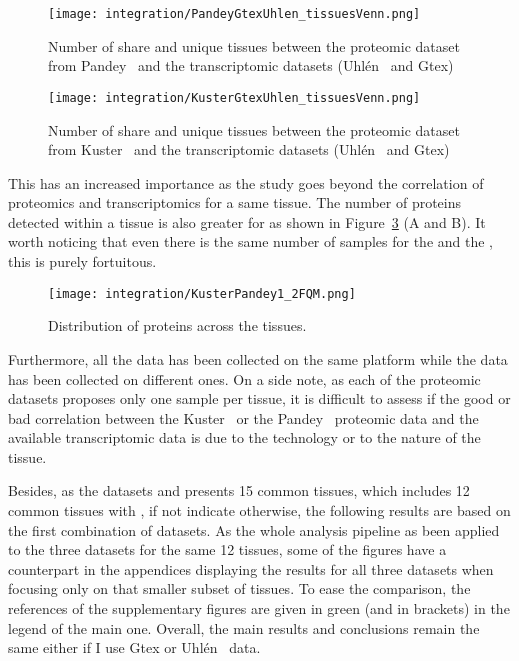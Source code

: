 \begin{figure}%
    \texttt{[image: integration/PandeyGtexUhlen\_tissuesVenn.png]}
    \centering
    \caption{\label{VennTissuePandeyGtexUhlen}Number of share and unique
    tissues between the proteomic dataset from Pandey \etal\ and the
    transcriptomic datasets (Uhlén \etal\ and Gtex)}
\end{figure}

\begin{figure}%
    \texttt{[image: integration/KusterGtexUhlen\_tissuesVenn.png]}
    \centering
    \caption{\label{VennTissueKusterGtexUhlen}Number of share and unique
    tissues between the proteomic dataset from Kuster \etal\ and the
    transcriptomic datasets (Uhlén \etal\ and Gtex)}
\end{figure}

This has an increased importance as the study goes beyond the correlation of
proteomics and transcriptomics for a same tissue. The number of proteins
detected within a tissue is also greater for  as shown
in Figure~\ref{KusterPandeyFQM} (A and B).
It worth noticing that even there is the same number of samples for the
 and the , this is purely fortuitous.

\begin{figure}%
    \texttt{[image: integration/KusterPandey1\_2FQM.png]}\centering
    \caption{\label{KusterPandeyFQM}Distribution of proteins across the tissues.}
\end{figure}

Furthermore, all the  data has been
collected on the same platform while the  data has been
collected on different ones. On a side note, as each of the proteomic datasets
proposes only one sample per tissue, it is difficult to assess if the good or bad
correlation between the Kuster \etal\ or the Pandey \etal\ proteomic data
and the available transcriptomic data is due to the technology or
to the nature of the tissue.

Besides, as the datasets  and  presents 15 common
tissues, which includes 12 common tissues with , if not
indicate otherwise, the following results are based on the first combination of
datasets. As the whole analysis pipeline as been applied to the three datasets
for the same 12 tissues, some of the figures have a counterpart in the
appendices displaying the results for all three datasets when focusing only on
that smaller subset of tissues. To ease the comparison, the references of the
supplementary figures are given in green (and in brackets) in the legend of the
main one. Overall, the main results and conclusions remain the same either if
I use Gtex or Uhlén \etal\ data.


